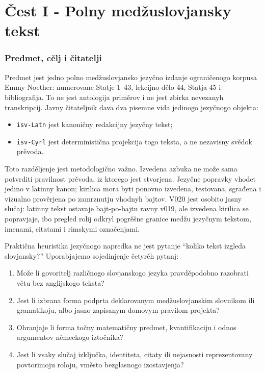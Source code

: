\documentclass[11pt]{article}
\newcommand{\code}[1]{\texttt{#1}}
\begin{document}
\part*{Čest I - Polny medžuslovjansky tekst}

\section{Predmet, cělj i čitatelji}

Predmet jest jedno polno medžuslovjansko jezyčno izdanje ograničenogo korpusa Emmy Noether: numerovane Statje 1--43, lekcijno dělo 44, Statja 45 i bibliografija. To ne jest antologija priměrov i ne jest zbirka nevezanyh transkripcij. Javny čitateljnik dava dva pisemne vida jedinogo jezyčnogo objekta:

\begin{itemize}
\item \code{isv-Latn} jest kanoničny redakcijny jezyčny tekst;
\item \code{isv-Cyrl} jest deterministična projekcija togo teksta, a ne nezavisny svědok prěvoda.
\end{itemize}

Toto razděljenje jest metodologično važno. Izvedena azbuka ne može sama potvrditi pravilnost prěvoda, iz ktorego jest stvorjena. Jezyčne popravky vhodet jedino v latinny kanon; kirilica mora byti ponovno izvedena, testovana, sgrađena i vizualno prověrjena po zamrznutju vhodnyh bajtov. V020 jest osobito jasny slučaj: latinny tekst ostavaje bajt-po-bajtu ravny v019, ale izvedena kirilica se popravjaje, ibo pregled rolij odkryl pogrěšne granice medžu jezyčnym tekstom, imenami, citatami i rimskymi označenjami.

Praktična heuristika jezyčnogo napredka ne jest pytanje ``koliko tekst izgleda slovjansky?'' Uporabjajemo sojedinjenje četyrěh pytanj:

\begin{enumerate}
\item Može li govoritelj različnogo slovjanskogo jezyka pravděpodobno razobrati větu bez anglijskogo teksta?
\item Jest li izbrana forma podprta deklarovanym medžuslovjanskim slovnikom ili gramatikoju, albo jasno zapisanym domovym pravilom projekta?
\item Ohranjaje li forma točny matematičny predmet, kvantifikaciju i odnos argumentov německogo iztočnika?
\item Jest li vsaky slučaj izključka, identiteta, citaty ili nejasnosti reprezentovany povtorimoju roloju, vměsto bezglasnogo izostavjenja?
\end{enumerate}
\end{document}
